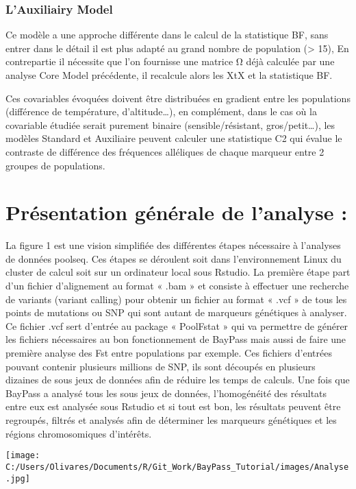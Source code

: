 \documentclass[
  openany]{book}
\begin{document}
\hypertarget{lauxiliairy-model}{%
\subsubsection*{L'Auxiliairy Model}\label{lauxiliairy-model}}

Ce modèle a une approche différente dans le calcul de la statistique BF, sans entrer dans le détail il est plus adapté au grand nombre de population (\textgreater{} 15), En contrepartie il nécessite que l'on fournisse une matrice Ω déjà calculée par une analyse Core Model précédente, il recalcule alors les XtX et la statistique BF.

Ces covariables évoquées doivent être distribuées en gradient entre les populations (différence de température, d'altitude\ldots), en complément, dans le cas où la covariable étudiée serait purement binaire (sensible/résistant, gros/petit\ldots), les modèles Standard et Auxiliaire peuvent calculer une statistique C2 qui évalue le contraste de différence des fréquences alléliques de chaque marqueur entre 2 groupes de populations.

\hypertarget{pruxe9sentation-guxe9nuxe9rale-de-lanalyse}{%
\section*{Présentation générale de l'analyse :}\label{pruxe9sentation-guxe9nuxe9rale-de-lanalyse}}

La figure 1 est une vision simplifiée des différentes étapes nécessaire à l'analyses de données poolseq. Ces étapes se déroulent soit dans l'environnement Linux du cluster de calcul soit sur un ordinateur local sous Rstudio.
La première étape part d'un fichier d'alignement au format « .bam » et consiste à effectuer une recherche de variants (variant calling) pour obtenir un fichier au format « .vcf » de tous les points de mutations ou SNP qui sont autant de marqueurs génétiques à analyser. Ce fichier .vcf sert d'entrée au package « PoolFstat » qui va permettre de générer les fichiers nécessaires au bon fonctionnement de BayPass mais aussi de faire une première analyse des Fst entre populations par exemple. Ces fichiers d'entrées pouvant contenir plusieurs millions de SNP, ils sont découpés en plusieurs dizaines de sous jeux de données afin de réduire les temps de calculs. Une fois que BayPass a analysé tous les sous jeux de données, l'homogénéité des résultats entre eux est analysée sous Rstudio et si tout est bon, les résultats peuvent être regroupés, filtrés et analysés afin de déterminer les marqueurs génétiques et les régions chromosomiques d'intérêts.

\texttt{[image: C:/Users/Olivares/Documents/R/Git\_Work/BayPass\_Tutorial/images/Analyse.jpg]}

  
\end{document}
